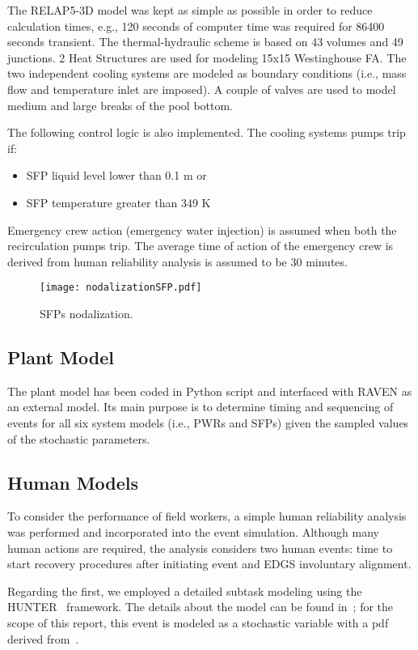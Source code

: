 The RELAP5-3D model was kept as simple as possible in order to reduce calculation times, e.g., 120 seconds 
of computer time was required for 86400 seconds transient. The thermal-hydraulic scheme is based on
43 volumes and 49 junctions. 2 Heat Structures are used for modeling 15x15 Westinghouse FA. 
The two independent cooling systems are modeled as boundary conditions (i.e., mass flow and 
temperature inlet are imposed). A couple of valves are used to model medium and large breaks of the pool bottom.

The following control logic is also implemented. The cooling systems pumps trip if: 
\begin{itemize}
  \item SFP liquid level lower than 0.1 m or
  \item SFP temperature greater than 349 K
\end{itemize}

Emergency crew action (emergency water injection) is assumed when both the recirculation pumps trip. 
The average time of action of the emergency crew is derived from human reliability analysis is assumed 
to be 30 minutes.

\begin{figure}
    \centering
    \texttt{[image: nodalizationSFP.pdf]}
    \caption{SFPs nodalization.}
    \label{fig:SFPnodalization}
\end{figure}

\subsection{Plant Model}
\label{sec:plantModel}
The plant model has been coded in Python script and interfaced with RAVEN as an 
external model. Its main purpose is to determine timing and sequencing of events 
for all six system models (i.e., PWRs and SFPs) given the sampled values of the 
stochastic parameters.

\subsection{Human Models}
To consider the performance of field workers, a simple human reliability analysis was 
performed and incorporated into the event simulation. Although many human actions are 
required, the analysis considers two human events: time to start recovery procedures 
after initiating event and EDGS involuntary alignment.

Regarding the first, we employed a detailed subtask modeling using the HUNTER~\cite{boringHUNTER} 
framework. The details about 
the model can be found in~\cite{hunterReport2016}; for the scope of this report, this event 
is modeled as a stochastic variable with a pdf derived from~\cite{hunterReport2016}. 

